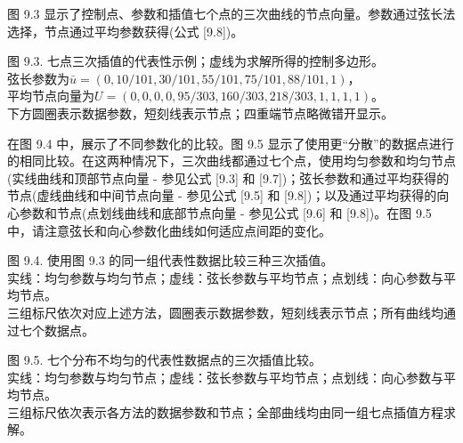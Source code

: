 \documentclass[../main.tex]{subfiles}
\begin{document}
图 9.3 显示了控制点、参数和插值七个点的三次曲线的节点向量。参数通过弦长法选择，节点通过平均参数获得(公式 [9.8])。

\begin{center}
\begin{minipage}{27cm}
\vspace*{.6\baselineskip}
\centering
{}
\par\smallskip
图 9.3. 七点三次插值的代表性示例；虚线为求解所得的控制多边形。\\
弦长参数为$\bar u=(0,10/101,30/101,55/101,75/101,88/101,1)$，\\
平均节点向量为$U=(0,0,0,0,95/303,160/303,218/303,1,1,1,1)$。\\
下方圆圈表示数据参数，短刻线表示节点；四重端节点略微错开显示。
\end{minipage}
\end{center}

在图 9.4 中，展示了不同参数化的比较。图 9.5 显示了使用更“分散”的数据点进行的相同比较。在这两种情况下，三次曲线都通过七个点，使用均匀参数和均匀节点(实线曲线和顶部节点向量 - 参见公式 [9.3] 和 [9.7])；弦长参数和通过平均获得的节点(虚线曲线和中间节点向量 - 参见公式 [9.5] 和 [9.8])；以及通过平均获得的向心参数和节点(点划线曲线和底部节点向量 - 参见公式 [9.6] 和 [9.8])。在图 9.5 中，请注意弦长和向心参数化曲线如何适应点间距的变化。




\begin{center}
\begin{minipage}{27cm}
\vspace*{.6\baselineskip}
\centering
{}
\par\smallskip
图 9.4. 使用图 9.3 的同一组代表性数据比较三种三次插值。\\
实线：均匀参数与均匀节点；虚线：弦长参数与平均节点；点划线：向心参数与平均节点。\\
三组标尺依次对应上述方法，圆圈表示数据参数，短刻线表示节点；所有曲线均通过七个数据点。
\end{minipage}
\end{center}

\begin{center}
\begin{minipage}{27cm}
\vspace*{.6\baselineskip}
\centering
{}
\par\smallskip
图 9.5. 七个分布不均匀的代表性数据点的三次插值比较。\\
实线：均匀参数与均匀节点；虚线：弦长参数与平均节点；点划线：向心参数与平均节点。\\
三组标尺依次表示各方法的数据参数和节点；全部曲线均由同一组七点插值方程求解。
\end{minipage}
\end{center}
\end{document}
